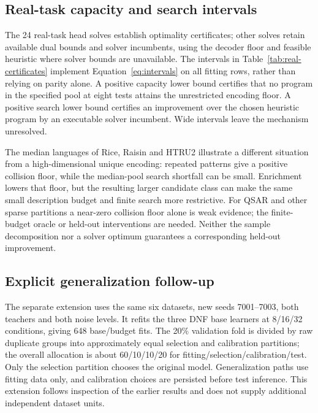 \documentclass[review,12pt]{elsarticle}
\begin{document}
\subsection{Real-task capacity and search intervals}\label{sec:certificate-results}

The 24 real-task head solves establish \IndependentOptimal{} optimality certificates; other solves retain available dual bounds and solver incumbents, using the decoder floor and feasible heuristic where solver bounds are unavailable. The intervals in Table~\ref{tab:real-certificates} implement Equation~\ref{eq:intervals} on all fitting rows, rather than relying on parity alone. A positive capacity lower bound certifies that no program in the specified pool at eight tests attains the unrestricted encoding floor. A positive search lower bound certifies an improvement over the chosen heuristic program by an executable solver incumbent. Wide intervals leave the mechanism unresolved.

The median languages of Rice, Raisin and HTRU2 illustrate a different situation from a high-dimensional unique encoding: repeated patterns give a positive collision floor, while the median-pool search shortfall can be small. Enrichment lowers that floor, but the resulting larger candidate class can make the same small description budget and finite search more restrictive. For QSAR and other sparse partitions a near-zero collision floor alone is weak evidence; the finite-budget oracle or held-out interventions are needed. Neither the sample decomposition nor a solver optimum guarantees a corresponding held-out improvement.

\subsection{Explicit generalization follow-up}\label{sec:generalization-results}
The separate extension uses the same six datasets, new seeds 7001--7003, both teachers and both noise levels. It refits the three DNF base learners at 8/16/32 conditions, giving 648 base/budget fits. The 20\% validation fold is divided by raw duplicate groups into approximately equal selection and calibration partitions; the overall allocation is about 60/10/10/20 for fitting/selection/calibration/test. Only the selection partition chooses the original model. Generalization paths use fitting data only, and calibration choices are persisted before test inference. This extension follows inspection of the earlier results and does not supply additional independent dataset units.
\end{document}

